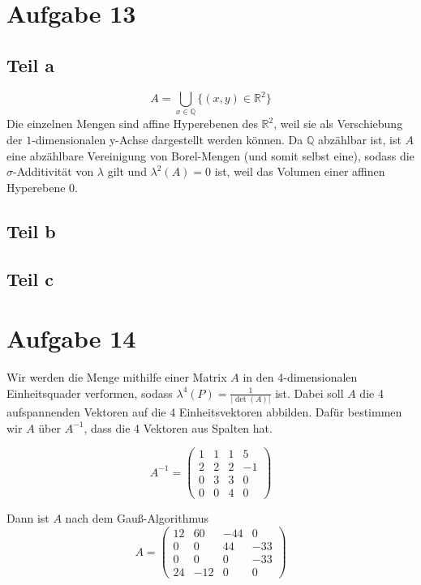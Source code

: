 \documentclass[10pt,a4paper]{article}
\begin{document}
\section{Aufgabe 13}

\subsection{Teil a}
\begin{equation}
  A = \bigcup_{x \in \mathbb{Q}} \{ (x, y) \in \mathbb{R}^{2} \}
\end{equation}
Die einzelnen Mengen sind affine Hyperebenen des $\mathbb{R}^{2}$, weil sie als Verschiebung der $1$-dimensionalen y-Achse dargestellt werden können.
Da $\mathbb{Q}$ abzählbar ist, ist $A$ eine abzählbare Vereinigung von Borel-Mengen (und somit selbst eine), sodass die $\sigma$-Additivität von $\lambda$ gilt und $\lambda^{2}(A) = 0$ ist, weil das Volumen einer affinen Hyperebene $0$.

\subsection{Teil b}


\subsection{Teil c}

\section{Aufgabe 14}
Wir werden die Menge mithilfe einer Matrix $A$ in den 4-dimensionalen Einheitsquader verformen, sodass $\lambda^{4}(P) = \frac{1}{|\det(A)|}$ ist.
Dabei soll $A$ die 4 aufspannenden Vektoren auf die 4 Einheitsvektoren abbilden.
Dafür bestimmen wir $A$ über $A^{-1}$, dass die 4 Vektoren aus Spalten hat.

\begin{equation}
  A^{-1} = 
  \begin{pmatrix}
    1 & 1 & 1 & 5\\
    2 & 2 & 2 & -1\\
    0 & 3 & 3 & 0\\
    0 & 0 & 4 & 0
  \end{pmatrix}
\end{equation}

Dann ist $A$ nach dem Gauß-Algorithmus
\begin{equation}
  A = 
  \begin{pmatrix}
    12 & 60 & -44 & 0\\
    0 & 0 & 44 & -33\\
    0 & 0 & 0 & -33\\
    24 & -12 & 0 & 0
  \end{pmatrix}
\end{equation}
\end{document}
